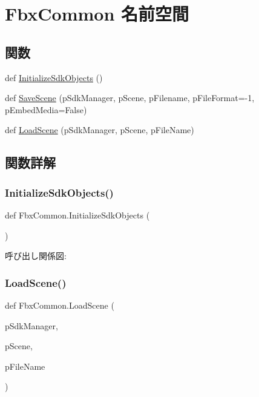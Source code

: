 \hypertarget{namespace_fbx_common}{}\section{Fbx\+Common 名前空間}
\label{namespace_fbx_common}
\subsection*{関数}
\begin{DoxyCompactItemize}
\item 
def \hyperlink{namespace_fbx_common_aef18edfff77ce008f4d3c6ca32b3cae6}{Initialize\+Sdk\+Objects} ()
\item 
def \hyperlink{namespace_fbx_common_aad3cf8f7b9a130d5d5bb59bf0ae79ce0}{Save\+Scene} (p\+Sdk\+Manager, p\+Scene, p\+Filename, p\+File\+Format=-\/1, p\+Embed\+Media=False)
\item 
def \hyperlink{namespace_fbx_common_a572b658696a14859a0965d4afd51caf6}{Load\+Scene} (p\+Sdk\+Manager, p\+Scene, p\+File\+Name)
\end{DoxyCompactItemize}


\subsection{関数詳解}
\mbox{\label{namespace_fbx_common_aef18edfff77ce008f4d3c6ca32b3cae6}} 
\subsubsection{\texorpdfstring{Initialize\+Sdk\+Objects()}{InitializeSdkObjects()}}
{\footnotesize\ttfamily def Fbx\+Common.\+Initialize\+Sdk\+Objects (\begin{DoxyParamCaption}{ }\end{DoxyParamCaption})}

呼び出し関係図\+:
\mbox{\label{namespace_fbx_common_a572b658696a14859a0965d4afd51caf6}} 
\subsubsection{\texorpdfstring{Load\+Scene()}{LoadScene()}}
{\footnotesize\ttfamily def Fbx\+Common.\+Load\+Scene (\begin{DoxyParamCaption}\item[{}]{p\+Sdk\+Manager,  }\item[{}]{p\+Scene,  }\item[{}]{p\+File\+Name }\end{DoxyParamCaption})}

